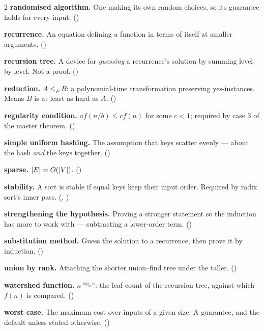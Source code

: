 \begin{multicols}{2}
\textbf{randomised algorithm.} One making its own random choices, so its
guarantee holds for every input. ()

\textbf{recurrence.} An equation defining a function in terms of itself at
smaller arguments. ()

\textbf{recursion tree.} A device for \emph{guessing} a recurrence's solution
by summing level by level. Not a proof. ()

\textbf{reduction.} $A \le_{P} B$: a polynomial-time transformation preserving
yes-instances. Means $B$ is at least as hard as $A$. ()

\textbf{regularity condition.} $af(n/b) \le cf(n)$ for some $c<1$; required by
case 3 of the master theorem. ()

\textbf{simple uniform hashing.} The assumption that keys scatter evenly ---
about the hash \emph{and} the keys together. ()

\textbf{sparse.} $|E| = O(|V|)$. ()

\textbf{stability.} A sort is stable if equal keys keep their input order.
Required by radix sort's inner pass. (,
)

\textbf{strengthening the hypothesis.} Proving a stronger statement so the
induction has more to work with --- subtracting a lower-order term.
()

\textbf{substitution method.} Guess the solution to a recurrence, then prove it
by induction. ()

\textbf{union by rank.} Attaching the shorter union--find tree under the
taller. ()

\textbf{watershed function.} $n^{\log_{b}a}$: the leaf count of the recursion
tree, against which $f(n)$ is compared. ()

\textbf{worst case.} The maximum cost over inputs of a given size. A
guarantee, and the default unless stated otherwise. ()

\end{multicols}
